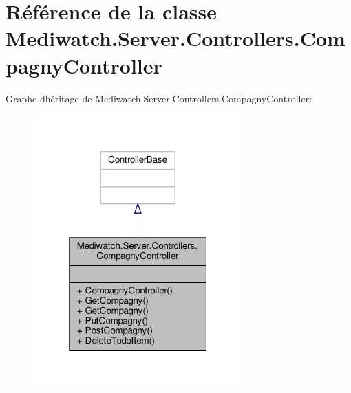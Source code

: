 \hypertarget{class_mediwatch_1_1_server_1_1_controllers_1_1_compagny_controller}{}\section{Référence de la classe Mediwatch.\+Server.\+Controllers.\+Compagny\+Controller}
\label{class_mediwatch_1_1_server_1_1_controllers_1_1_compagny_controller}


Graphe d\textquotesingle{}héritage de Mediwatch.\+Server.\+Controllers.\+Compagny\+Controller\+:\nopagebreak
\begin{figure}[H]
\begin{center}
\leavevmode
\includegraphics[width=229pt]{class_mediwatch_1_1_server_1_1_controllers_1_1_compagny_controller__inherit__graph}
\end{center}
\end{figure}


